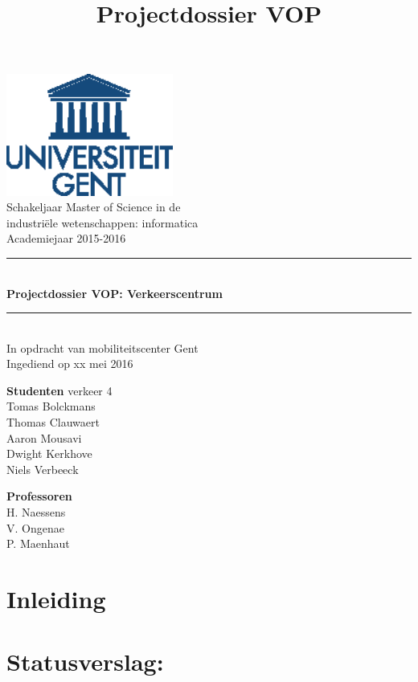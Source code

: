 \documentclass[a4paper]{article}
\title{Projectdossier VOP}
\newcommand{\HRule}{\rule{\linewidth}{0.5mm}}
\newcommand{\studenten} {Tomas Bolckmans \\Thomas Clauwaert\\Aaron Mousavi\\Dwight Kerkhove\\Niels Verbeeck}
\newcommand{\begeleiders}{H. Naessens\\V. Ongenae\\P. Maenhaut}
\newcommand{\titel}{Projectdossier VOP: Verkeerscentrum}
\newcommand{\ondertitel}{In opdracht van mobiliteitscenter Gent}
\newcommand{\datum}{xx mei 2016}
\newcommand{\academiejaar}{2015-2016}
\begin{document}
\begin{titlepage}
\begin{center}
\includegraphics[height=4cm]{Images/Ugentlogo.eps}\\[.5cm]

Schakeljaar Master of Science in de\\
industriële wetenschappen: informatica\\
Academiejaar \academiejaar{}

\vfill

\HRule \\[0.4cm]
{\huge \bfseries \titel{}}\\[0.4cm]
\HRule \\[0.4cm]

{\Large \ondertitel{}}\\[0.4cm]

Ingediend op \datum{}

\vfill
\begin{minipage}{0.49\textwidth}
\begin{flushleft}
\textbf{Studenten} verkeer 4\\
\studenten{}
\end{flushleft}
\end{minipage}
\begin{minipage}{0.49\textwidth}
\begin{flushright}
\textbf{Professoren}\\
\begeleiders{}\\
\end{flushright}
\end{minipage}

\end{center}
\end{titlepage}

\tableofcontents
\newpage

\section{Inleiding}
\label{sec:inleiding}
\lipsum[56]

\section{Statusverslag:}
\label{sec:statusverslag}
\end{document}
